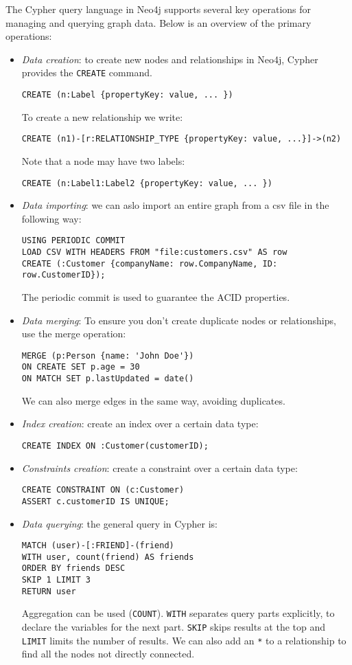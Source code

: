 The Cypher query language in Neo4j supports several key operations for managing and querying graph data. 
Below is an overview of the primary operations:
\begin{itemize}
    \item \textit{Data creation}: to create new nodes and relationships in Neo4j, Cypher provides the \texttt{CREATE} command.
        \begin{verbatim}
CREATE (n:Label {propertyKey: value, ... })
        \end{verbatim}
        To create a new relationship we write: 
        \begin{verbatim}
CREATE (n1)-[r:RELATIONSHIP_TYPE {propertyKey: value, ...}]->(n2)
        \end{verbatim}
        Note that a node may have two labels: 
        \begin{verbatim}
CREATE (n:Label1:Label2 {propertyKey: value, ... })
        \end{verbatim}
    \item \textit{Data importing}: we can aslo import an entire graph from a csv file in the following way: 
        \begin{verbatim}
USING PERIODIC COMMIT 
LOAD CSV WITH HEADERS FROM "file:customers.csv" AS row
CREATE (:Customer {companyName: row.CompanyName, ID: row.CustomerID}); 
        \end{verbatim}
        The periodic commit is used to guarantee the ACID properties. 
    \item \textit{Data merging}: To ensure you don't create duplicate nodes or relationships, use the merge operation: 
        \begin{verbatim}
MERGE (p:Person {name: 'John Doe'})
ON CREATE SET p.age = 30
ON MATCH SET p.lastUpdated = date()  
        \end{verbatim}
        We can also merge edges in the same way, avoiding duplicates. 
    \item \textit{Index creation}: create an index over a certain data type: 
        \begin{verbatim}
CREATE INDEX ON :Customer(customerID);
        \end{verbatim}
    \item \textit{Constraints creation}: create a constraint over a certain data type: 
        \begin{verbatim}
CREATE CONSTRAINT ON (c:Customer)
ASSERT c.customerID IS UNIQUE;
        \end{verbatim}
    \item \textit{Data querying}: the general query in Cypher is: 
        \begin{verbatim}
MATCH (user)-[:FRIEND]-(friend)
WITH user, count(friend) AS friends
ORDER BY friends DESC
SKIP 1 LIMIT 3
RETURN user
        \end{verbatim}
        Aggregation can be used (\texttt{COUNT}).
        \texttt{WITH} separates query parts explicitly, to declare the variables for the next part.
        \texttt{SKIP} skips results at the top and \texttt{LIMIT} limits the number of results.
        We can also add an \texttt{*} to a relationship to find all the nodes not directly connected. 
\end{itemize}